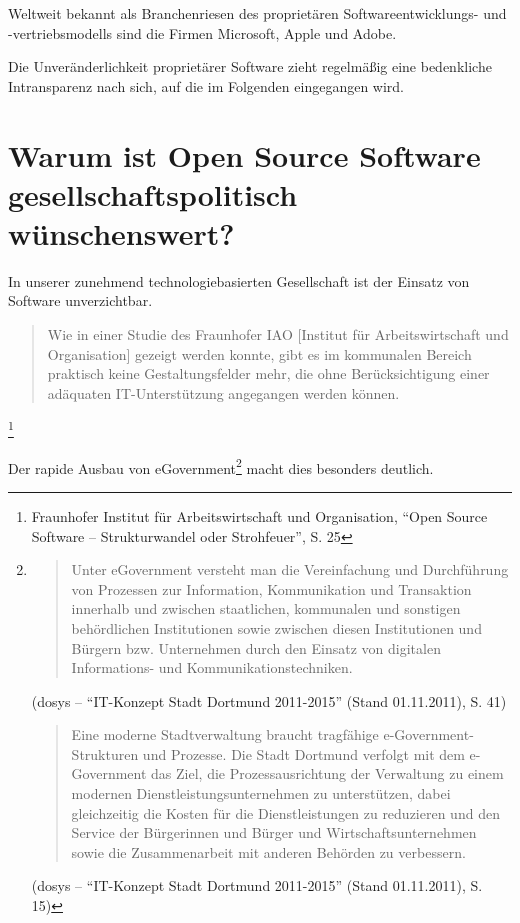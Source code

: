 \documentclass[a4paper]{scrartcl}
\begin{document}
Weltweit bekannt als Branchenriesen des proprietären Softwareentwicklungs- und
-vertriebsmodells sind die Firmen Microsoft, Apple und Adobe.

Die Unveränderlichkeit proprietärer Software zieht regelmäßig eine bedenkliche
Intransparenz nach sich, auf die im Folgenden eingegangen wird.

\section{Warum ist Open Source Software gesellschaftspolitisch wünschenswert?}

In unserer zunehmend technologiebasierten Gesellschaft ist der Einsatz von
Software unverzichtbar.

\begin{quote}Wie in einer Studie des Fraunhofer IAO [Institut für Arbeitswirtschaft
  und Organisation] gezeigt werden konnte, gibt es im kommunalen Bereich
  praktisch keine Gestaltungsfelder mehr, die ohne Berücksichtigung einer
  adäquaten IT-Unterstützung angegangen werden können.\end{quote}\footnote{Fraunhofer
  Institut für Arbeitswirtschaft und Organisation, ``Open Source Software --
  Strukturwandel oder Strohfeuer'', S. 25}

Der rapide Ausbau von eGovernment\footnote{\begin{quote}Unter eGovernment versteht man
    die Vereinfachung und Durchführung von Prozessen zur Information,
    Kommunikation und Transaktion innerhalb und zwischen staatlichen, kommunalen
    und sonstigen behördlichen Institutionen sowie zwischen diesen Institutionen
    und Bürgern bzw. Unternehmen durch den Einsatz von digitalen Informations-
    und Kommunikationstechniken.\end{quote} (dosys -- ``IT-Konzept Stadt Dortmund
  2011-2015'' (Stand 01.11.2011), S. 41) \begin{quote}Eine moderne Stadtverwaltung
    braucht tragfähige e-Government-Strukturen und Prozesse. Die Stadt Dortmund
    verfolgt mit dem e-Government das Ziel, die Prozessausrichtung der
    Verwaltung zu einem modernen Dienstleistungsunternehmen zu unterstützen,
    dabei gleichzeitig die Kosten für die Dienstleistungen zu reduzieren und den
    Service der Bürgerinnen und Bürger und Wirtschaftsunternehmen sowie die
    Zusammenarbeit mit anderen Behörden zu verbessern.\end{quote} (dosys -- ``IT-Konzept
  Stadt Dortmund 2011-2015'' (Stand 01.11.2011), S. 15)} macht dies besonders
deutlich.
\end{document}
